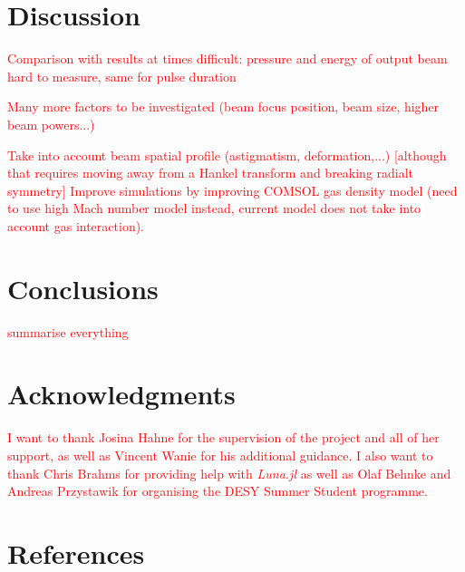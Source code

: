 \documentclass[a4paper]{jpconf}
\begin{document}
\cite{reiter2010}

\section{Discussion}

\textcolor{red}{
Comparison with results at times difficult: pressure and energy of output beam hard to measure, same for pulse duration}

\textcolor{red}{
Many more factors to be investigated (beam focus position, beam size, higher beam powers...)}

\textcolor{red}{
Take into account beam spatial profile (astigmatism, deformation,...) [although that requires moving away from a Hankel transform and breaking radialt symmetry]
}
\textcolor{red}{
Improve simulations by improving COMSOL gas density model (need to use high Mach number model instead, current model does not take into account gas interaction). 
}

\section{Conclusions}
\textcolor{red}{summarise everything}


\section*{Acknowledgments}
\textcolor{red}{I want to thank Josina Hahne for the supervision of the project and all of her support, as well as Vincent Wanie for his additional guidance. I also want to thank Chris Brahms for providing help with \textit{Luna.jl} as well as Olaf Behnke and Andreas Przystawik for organising the DESY Summer Student programme.}  


\section*{References}


\end{document}
